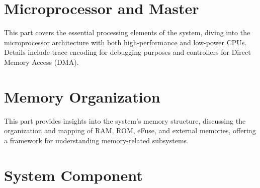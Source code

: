 \documentclass[openany, 10pt]{book}
\begin{document}
\setenglishformatting




\clearpage

\clearpage


\tableofcontents
\clearpage
\listoftables
\clearpage
\listoffigures





\part{Microprocessor and Master}


This part covers the essential processing elements of the system, diving into the microprocessor architecture with both high-performance and low-power CPUs. Details include trace encoding for debugging purposes and controllers for Direct Memory Access (DMA).


\part{Memory Organization}

This part provides insights into the system's memory structure, discussing the organization and mapping of RAM, ROM, eFuse, and external memories, offering a framework for understanding memory-related subsystems.


\part{System Component}
\end{document}
